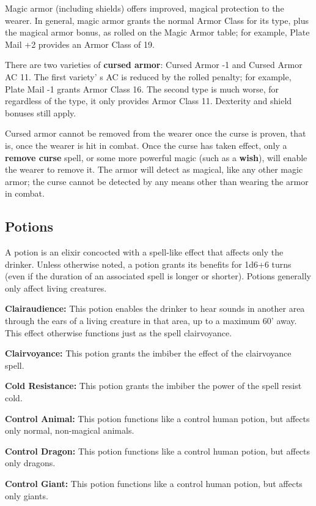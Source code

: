 \documentclass[a4paper,twoside,openany,10pt]{book}
\begin{document}
\begin{multicols}{2}
Magic armor (including shields) offers improved, magical protection to the wearer. In general, magic armor grants the normal Armor Class for its type, plus the magical armor bonus, as rolled on the Magic Armor table; for example, Plate Mail +2 provides an Armor Class of 19.

There are two varieties of \textbf{cursed armor}: Cursed Armor -1 and Cursed Armor AC 11. The first variety' s AC is reduced by the rolled penalty; for example, Plate Mail -1 grants Armor Class 16. The second type is much worse, for regardless of the type, it only provides Armor Class 11. Dexterity and shield bonuses still apply.

Cursed armor cannot be removed from the wearer once the curse is proven, that is, once the wearer is hit in combat. Once the curse has taken effect, only a \textbf{remove curse} spell, or some more powerful magic (such as a \textbf{wish}), will enable the wearer to remove it. The armor will detect as magical, like any other magic armor; the curse cannot be detected by any means other than wearing the armor in combat.

\subsection{Potions}\label{potions-1}

A potion is an elixir concocted with a spell-like effect that affects only the drinker. Unless otherwise noted, a potion grants its benefits for 1d6+6 turns (even if the duration of an associated spell is longer or shorter). Potions generally only affect living creatures.

\textbf{Clairaudience: }This potion enables the drinker to hear sounds in another area through the ears of a living creature in that area, up to a maximum 60' away. This effect otherwise functions just as the spell clairvoyance.

\textbf{Clairvoyance: }This potion grants the imbiber the effect of the clairvoyance spell.

\textbf{Cold Resistance:} This potion grants the imbiber the power of the spell resist cold.

\textbf{Control Animal: }This potion functions like a control human potion, but affects only normal, non-magical animals.

\textbf{Control Dragon: }This potion functions like a control human potion, but affects only dragons.

\textbf{Control Giant:} This potion functions like a control human potion, but affects only giants.


\end{multicols}
\end{document}
